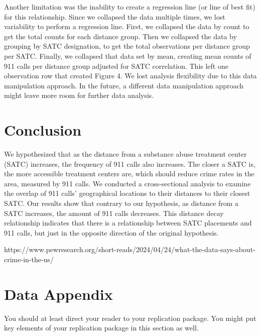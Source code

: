 \documentclass[12pt]{article}
\begin{document}
Another limitation was the inability to create a regression line (or line of best fit) for this relationship. Since we collapsed the data multiple times, we lost variability to perform a regression line. First, we collapsed the data by count to get the total counts for each distance group. Then we collapsed the data by grouping by SATC designation, to get the total observations per distance group per SATC. Finally, we collapsed that data set by mean, creating mean counts of 911 calls per distance group adjusted for SATC correlation. This left one observation row that created Figure 4. We lost analysis flexibility due to this data manipulation approach. In the future, a different data manipulation approach might leave more room for further data analysis. 

\section{Conclusion}
\label{sec:conclusion}

    We hypothesized that as the distance from a substance abuse treatment center (SATC) increases, the frequency of 911 calls also increases. The closer a SATC is, the more accessible treatment centers are, which should reduce crime rates in the area, measured by 911 calls. We conducted a cross-sectional analysis to examine the overlap of 911 calls' geographical locations to their distances to their closest SATC. Our results show that contrary to our hypothesis, as distance from a SATC increases, the amount of 911 calls decreases. This distance decay relationship indicates that there is a relationship between SATC placements and 911 calls, but just in the opposite direction of the original hypothesis. 


 

\newpage
\singlespacing
\setlength\bibsep{0pt}



https://www.pewresearch.org/short-reads/2024/04/24/what-the-data-says-about-crime-in-the-us/

\newpage
\section*{Data Appendix} \label{sec:appendixa}

You should at least direct your reader to your replication package. You might put key elements of your replication package in this section as well.
\end{document}
